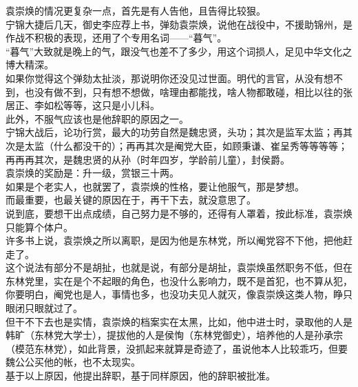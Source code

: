 \begin{multicols}{\theparacolNo}
袁崇焕的情况更复杂一点，首先是有人告他，且告得比较狠。\\

宁锦大捷后几天，御史李应荐上书，弹劾袁崇焕，说他在战役中，不援助锦州，是作战不积极的表现，还用了个专用名词——“暮气”。\\

“暮气”大致就是晚上的气，跟没气也差不了多少，用这个词损人，足见中华文化之博大精深。\\

如果你觉得这个弹劾太扯淡，那说明你还没见过世面。明代的言官，从没有想不到，也没有做不到，只有想不想做，啥理由都能找，啥人物都敢碰，相比以往的张居正、李如松等等，这只是小儿科。\\

此外，不服气应该也是他辞职的原因之一。\\

宁锦大战后，论功行赏，最大的功劳自然是魏忠贤，头功；其次是监军太监；再其次是太监（什么都没干的）；再再其次是阉党大臣，如顾秉谦、崔呈秀等等等等；再再再其次，是魏忠贤的从孙（时年四岁，学龄前儿童），封侯爵。\\

袁崇焕的奖励是：升一级，赏银三十两。\\

如果是个老实人，也就罢了，袁崇焕的性格，要让他服气，那是梦想。\\

而最重要，也最关键的原因在于，再干下去，就没意思了。\\

说到底，要想干出点成绩，自己努力是不够的，还得有人罩着，按此标准，袁崇焕只能算个体户。\\

许多书上说，袁崇焕之所以离职，是因为他是东林党，所以阉党容不下他，把他赶走了。\\

这个说法有部分不是胡扯，也就是说，有部分是胡扯，袁崇焕虽然职务不低，但在东林党里，实在是个不起眼的角色，也没什么影响力，既不是首犯，也不算从犯，你要明白，阉党也是人，事情也多，也没功夫见人就灭，像袁崇焕这类人物，睁只眼闭只眼就过了。\\

但干不下去也是实情，袁崇焕的档案实在太黑，比如，他中进士时，录取他的人是韩旷（东林党大学士），提拔他的人是侯恂（东林党御史），培养他的人是孙承宗（模范东林党），如此背景，没抓起来就算是奇迹了，虽说他本人比较乖巧，但要魏公公买他的帐，也不太现实。\\

基于以上原因，他提出辞职，基于同样原因，他的辞职被批准。\\


\end{multicols}
